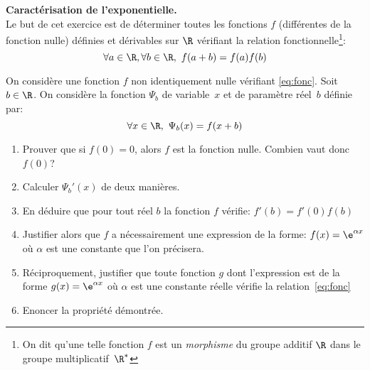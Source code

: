 \begin{exercice}
\textbf{Caract\'erisation de  l'exponentielle.}\\
Le but de cet exercice est de d\'eterminer toutes les fonctions $f$
(diff\'erentes de la fonction nulle)
d\'efinies et d\'erivables sur $\R$ v\'erifiant la relation fonctionnelle\footnote{On dit qu'une telle fonction $f$ est un \emph{morphisme} du groupe additif
$\R$ dans le groupe multiplicatif~$\R^*$}:
\begin{equation}
  \label{eq:fonc}
  \forall a\in\R,\forall b\in\R,\ f(a+b)=f(a)f(b) 
\end{equation}

On consid\`ere une fonction $f$ non identiquement nulle v\'erifiant \eqref{eq:fonc}.
 Soit $b\in\R$. On consid\`ere la fonction $\Psi_b$ de variable~$x$ et de param\`etre r\'eel~$b$ d\'efinie par:
\[\forall x\in\R,\ \Psi_b(x)=f(x+b)\]
\begin{enumerate}
\item Prouver que si $f(0)=0$, alors $f$ est la fonction
  nulle. Combien vaut donc $f(0)$?
\item Calculer $\Psi_b'(x)$ de deux mani\`eres.
\item En d\'eduire que pour tout r\'eel $b$ la fonction $f$ v\'erifie:
  $ f'(b)=f'(0)f(b)$

\item Justifier alors que $f$ a n\'ecessairement une
  expression de la forme: $f(x)=\e^{\alpha x}$
o\`u $\alpha$ est une constante que l'on pr\'ecisera.

\item R\'eciproquement, justifier que toute fonction $g$ dont
  l'expression est de la forme \mbox{$g(x)=\e^{\alpha x}$} o\`u
  $\alpha$ est une constante r\'eelle v\'erifie la relation~\eqref{eq:fonc}
\item Enoncer la propri\'et\'e d\'emontr\'ee.
\end{enumerate}


 
\end{exercice}
